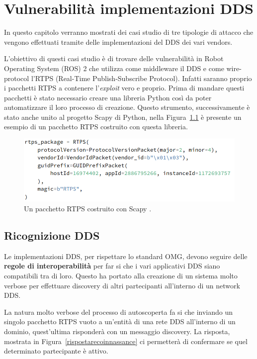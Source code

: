 \chapter{Vulnerabilità implementazioni DDS}
\label{chvulimpldds}

In questo capitolo verranno mostrati dei casi studio
di tre tipologie di 
attacco che vengono effettuati tramite delle 
implementazioni del DDS dei vari vendors.

L'obiettivo di questi casi studio è di trovare delle 
vulnerabilità in Robot Operating System (ROS) 2 che 
utilizza come middleware il DDS e come wire-protocol 
l'RTPS (Real-Time Publish-Subscribe Protocol).
Infatti saranno proprio i pacchetti RTPS a contenere 
l'\textit{exploit} vero e proprio. Prima di mandare questi 
pacchetti è stato necessario creare una libreria Python 
così da poter automatizzare il loro processo di creazione.
Questo strumento, successivamente è stato anche unito al 
progetto Scapy di Python, nella 
Figura~\ref{rptspacketheaderscapy} è presente un esempio 
di un pacchetto RTPS costruito con questa libreria.

\begin{figure}[H]
    \centering
    \includegraphics[width=15.2cm, keepaspectratio]{img/rptspacketheaderscapy.png}
    \caption{Un pacchetto RTPS costruito 
    con Scapy \cite{mayoral2022robot}.}
    \label{rptspacketheaderscapy}
\end{figure}

\section{Ricognizione DDS}
Le implementazioni DDS, per rispettare lo standard 
OMG, devono seguire delle \textbf{regole di interoperabilità} 
per far si che i vari applicativi DDS siano compatibili 
tra di loro. Questo ha portato alla creazione di un sistema
molto verbose per effettuare discovery 
di altri partecipanti all'interno di un network DDS.


La natura molto verbose del processo di autoscoperta 
fa si che inviando un singolo pacchetto RTPS vuoto 
a un'entità di una rete DDS all'interno di un dominio,
quest'ultima risponderà 
con un messaggio discovery. La risposta, mostrata
in Figura~\ref{rispostarecoinnassance} ci permetterà di 
confermare se quel determinato partecipante è attivo.

